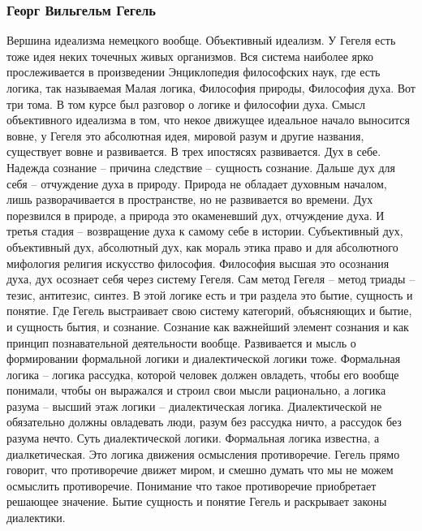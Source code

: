 \documentclass[a4paper, 12pt]{article}
\begin{document}

\subsubsection{Георг Вильгельм Гегель}

Вершина идеализма немецкого вообще. Объективный идеализм. У Гегеля есть 
тоже идея неких точечных живых организмов. Вся система наиболее ярко 
прослеживается в произведении Энциклопедия философских наук, где есть 
логика, так называемая Малая логика, Философия природы, Философия духа. 
Вот три тома. В том курсе был разговор о логике и философии духа. Смысл 
объективного идеализма в том, что некое движущее идеальное начало 
выносится вовне, у Гегеля это абсолютная идея, мировой разум и другие 
названия, существует вовне и развивается. В трех ипостясях развивается. 
Дух в себе. Надежда сознание -- причина следствие -- сущность сознание. 
Дальше дух для себя -- отчуждение духа в природу. Природа не обладает 
духовным началом, лишь разворачивается в пространстве, но не развивается 
во времени. Дух порезвился в природе, а природа это окаменевший дух, 
отчуждение духа. И третья стадия -- возвращение духа к самому себе 
в истории. Субъективный дух, объективный дух, абсолютный дух, как мораль 
этика право и для абсолютного мифология религия искусство философия. 
Философия высшая это осознания духа, дух осознает себя через систему 
Гегеля. Сам метод Гегеля -- метод триады -- тезис, антитезис, синтез. 
В этой логике есть и три раздела это бытие, сущность и понятие. Где 
Гегель выстраивает свою систему категорий, объясняющих и бытие, 
и сущность бытия, и сознание. Сознание как важнейший элемент сознания 
и как принцип познавательной деятельности вообще. Развивается и мысль 
о формировании формальной логики и диалектической логики тоже. 
Формальная логика -- логика рассудка, которой человек должен овладеть, 
чтобы его вообще понимали, чтобы он выражался и строил свои мысли 
рационально, а логика разума -- высший этаж логики -- диалектическая 
логика. Диалектической не обязательно должны овладевать люди, разум без 
рассудка ничто, а рассудок без разума нечто. Суть диалектической логики. 
Формальная логика известна, а диалкетическая. Это логика движения 
осмысления противоречие. Гегель прямо говорит, что противоречие движет 
миром, и смешно думать что мы не можем осмыслить противоречие. Понимание 
что такое противоречие приобретает решающее значение. Бытие сущность 
и понятие Гегель и раскрывает законы диалектики.
\end{document}
